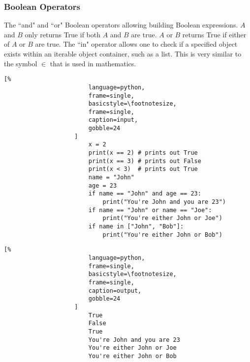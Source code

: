 \documentclass[crop=false,class=book]{standalone}
\begin{document}
            \subsubsection{Boolean Operators}
                The ``and" and ``or" Boolean operators allowing
                building Boolean expressions. $A$ and $B$ only
                returns True if both $A$ and $B$ are true. $A$ or
                $B$ returns True if either of $A$ or $B$ are
                true. The ``in" operator allows one to check if a
                specified object exists within an iterable object
                container, such as a list. This is very similar
                to the symbol $\in$ that is used in
                mathematics.\newline
                \begin{minipage}[t]{0.48\textwidth}
                    \begin{lstlisting}[%
                        language=python,
                        frame=single,
                        basicstyle=\footnotesize,
                        frame=single,
                        caption=input,
                        gobble=24
                    ]
                        x = 2
                        print(x == 2) # prints out True
                        print(x == 3) # prints out False
                        print(x < 3)  # prints out True
                        name = "John"
                        age = 23
                        if name == "John" and age == 23:
                            print("You're John and you are 23")
                        if name == "John" or name == "Joe":
                            print("You're either John or Joe")
                        if name in ["John", "Bob"]:
                            print("You're either John or Bob")
                \end{lstlisting}
                \end{minipage}\hfill
                \begin{minipage}[t]{0.48\textwidth}
                    \begin{lstlisting}[%
                        language=python,
                        frame=single,
                        basicstyle=\footnotesize,
                        frame=single,
                        caption=output,
                        gobble=24
                    ]
                        True
                        False
                        True
                        You're John and you are 23
                        You're either John or Joe
                        You're either John or Bob
                    \end{lstlisting}
                \end{minipage}
\end{document}
